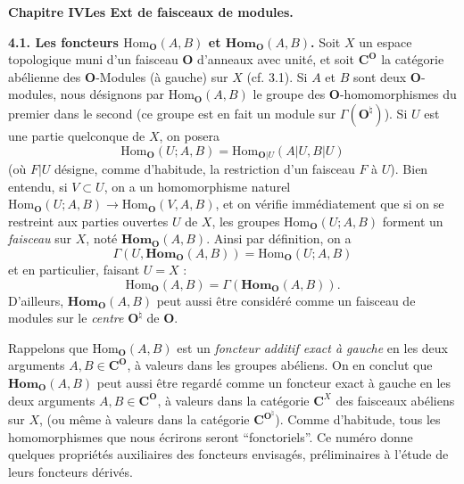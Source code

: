 \clearpage
{}

\begin{center}
{\large\bfseries Chapitre IV\quad Les Ext de faisceaux de modules.}
\end{center}

\textbf{4.1. Les foncteurs $\mathrm{Hom}_\mathbf O(A,B)$ et
$\mathbf{Hom}_\mathbf O(A,B)$.}
Soit $X$ un espace topologique muni d'un faisceau $\mathbf O$ d'anneaux avec unité,
et soit $\mathbf C^\mathbf O$ la catégorie abélienne des $\mathbf O$-Modules (à gauche) sur $X$
(cf. 3.1). Si $A$ et $B$ sont deux $\mathbf O$-modules, nous désignons par
$\mathrm{Hom}_\mathbf O(A,B)$ le groupe des $\mathbf O$-homomorphismes du premier dans le
second (ce groupe est en fait un module sur $\Gamma(\mathbf O^\natural)$). Si $U$
est une partie quelconque de $X$, on posera
\[
\mathrm{Hom}_\mathbf O(U;A,B)=\mathrm{Hom}_{\mathbf O|U}(A|U,B|U)
\]
(où $F|U$ désigne, comme d'habitude, la restriction d'un faisceau $F$ à $U$).
Bien entendu, si $V\subset U$, on a un homomorphisme naturel
$\mathrm{Hom}_\mathbf O(U;A,B)\to\mathrm{Hom}_\mathbf O(V,A,B)$, et on vérifie
immédiatement que si on se restreint aux parties ouvertes $U$ de $X$, les
groupes $\mathrm{Hom}_\mathbf O(U;A,B)$ forment un \textit{faisceau} sur $X$, noté
$\mathbf{Hom}_\mathbf O(A,B)$. Ainsi par définition, on a
\[
\tag{4.1.1}
\Gamma(U,\mathbf{Hom}_\mathbf O(A,B))=\mathrm{Hom}_\mathbf O(U;A,B)
\]
et en particulier, faisant $U=X$ :
\[
\tag{4.1.2}
\mathrm{Hom}_\mathbf O(A,B)=\Gamma(\mathbf{Hom}_\mathbf O(A,B)).
\]
D'ailleurs, $\mathbf{Hom}_\mathbf O(A,B)$ peut aussi être considéré comme un faisceau
de modules sur le \textit{centre} $\mathbf O^\natural$ de $\mathbf O$.

Rappelons que $\mathrm{Hom}_\mathbf O(A,B)$ est un \textit{foncteur additif exact à
gauche} en les deux arguments $A,B\in \mathbf C^\mathbf O$, à valeurs dans les groupes
abéliens. On en conclut que $\mathbf{Hom}_\mathbf O(A,B)$ peut aussi être regardé comme
un foncteur exact à gauche en les deux arguments $A,B\in \mathbf C^\mathbf O$, à valeurs dans
la catégorie $\mathbf C^X$ des faisceaux abéliens sur $X$, (ou même à valeurs dans la
catégorie $\mathbf C^{\mathbf O^\natural}$). Comme d'habitude, tous les homomorphismes que nous
écrirons seront ``fonctoriels''. Ce numéro donne quelques propriétés
auxiliaires des foncteurs envisagés, préliminaires à l'étude de leurs foncteurs
dérivés.

